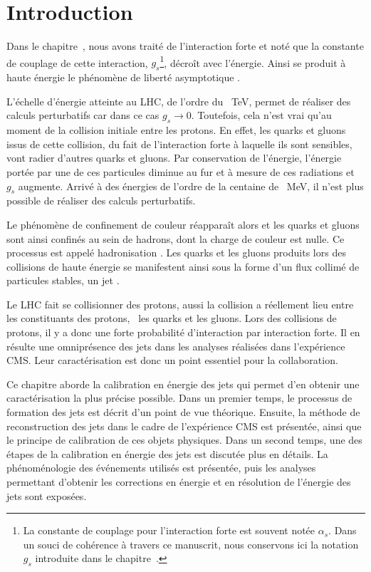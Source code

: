\section{Introduction}\label{chapter-JERC-section-introduction}
Dans le chapitre~, nous avons traité de l'interaction forte et noté que la constante de couplage de cette interaction, $g_s$\footnote{La constante de couplage pour l'interaction forte est souvent notée $\alpha_s$. Dans un souci de cohérence à travers ce manuscrit, nous conservons ici la notation $g_s$ introduite dans le chapitre~.}, décroît  avec l'énergie.
Ainsi se produit à haute énergie le phénomène de \og liberté asymptotique \fg.
\par L'échelle d'énergie atteinte au LHC, de l'ordre du \SI{}{\TeV}, permet de réaliser des calculs perturbatifs car dans ce cas $g_s \to 0$. Toutefois, cela n'est vrai qu'au moment de la collision initiale entre les protons.
En effet, les quarks et gluons issus de cette collision, du fait de l'interaction forte à laquelle ils sont sensibles, vont radier d'autres quarks et gluons.
Par conservation de l'énergie, l'énergie portée par une de ces particules diminue au fur et à mesure de ces radiations et $g_s$ augmente. Arrivé à des énergies de l'ordre de la centaine de \SI{}{\MeV}, il n'est plus possible de réaliser des calculs perturbatifs.
\par Le phénomène de confinement de couleur réapparaît alors et les quarks et gluons sont ainsi confinés au sein de hadrons, dont la charge de couleur est nulle.
Ce processus est appelé \og hadronisation \fg.
Les quarks et les gluons produits lors des collisions de haute énergie se manifestent ainsi sous la forme d'un flux collimé de particules stables, un \og jet \fg.
\par Le LHC fait se collisionner des protons, aussi la collision a réellement lieu entre les constituants des protons, \ie\ les quarks et les gluons. Lors des collisions de protons, il y a donc une forte probabilité d'interaction par interaction forte. Il en résulte une omniprésence des jets dans les analyses réalisées dans l'expérience CMS. Leur caractérisation est donc un point essentiel pour la collaboration.
\par Ce chapitre aborde la calibration en énergie des jets qui permet d'en obtenir une caractérisation la plus précise possible.
Dans un premier temps, le processus de formation des jets est décrit d'un point de vue théorique. Ensuite, la méthode de reconstruction des jets dans le cadre de l'expérience CMS est présentée, ainsi que le principe de calibration de ces objets physiques.
Dans un second temps, une des étapes de la calibration en énergie des jets est discutée plus en détails. La phénoménologie des événements utilisés est présentée, puis les analyses permettant d'obtenir les corrections en énergie et en résolution de l'énergie des jets sont exposées.